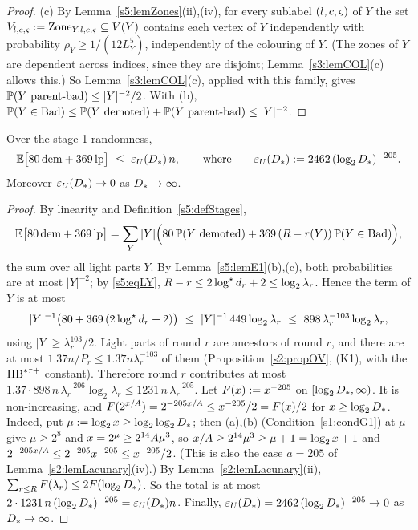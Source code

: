 \begin{proof}
(c) By Lemma~\ref{s5:lemZones}(ii),(iv), for every sublabel $(l,c,\varsigma)$ of $Y$ the set $V_{l,c,\varsigma}\mathrel{:=}\mathrm{Zone}_{Y,l,c,\varsigma}\subseteq V(Y)$ contains each vertex of $Y$ independently with probability $\rho_Y\ge 1/(12L_Y^5)$, independently of the colouring of $Y$. (The zones of $Y$ are dependent across indices, since they are disjoint; Lemma~\ref{s3:lemCOL}(c) allows this.) So Lemma~\ref{s3:lemCOL}(c), applied with this family, gives $\mathbb{P}(Y\text{ parent-bad})\le|Y|^{-2}/2$. With (b), $\mathbb{P}(Y\in\mathrm{Bad})\le\mathbb{P}(Y\text{ demoted})+\mathbb{P}(Y\text{ parent-bad})\le|Y|^{-2}$.
\end{proof}

\begin{lemma}\label{s5:lemExpect}
Over the stage-1 randomness,
\[
\Ex\bigl[\cVX\,\mathrm{dem}+\cPV\,\mathrm{lp}\bigr]\ \le\ \epsU(\Dstar)\,n,\qquad\text{where}\qquad \epsU(\Dstar)\defeq 2462\,(\log_2\Dstar)^{-205}.
\]
Moreover $\varepsilon_{U}(D_{*})\to0$ as $D_{*}\to\infty$.
\deps{\ref{s5:lemE1}, \ref{s5:defStages}, \ref{s2:propOV}, \ref{s2:lemTower}, \ref{s2:lemLacunary}, \ref{s1:condG1}, \ref{s2:propStructure}}
\end{lemma}

\begin{proof}
By linearity and Definition~\ref{s5:defStages},
\[
\mathbb{E}\bigl[80\,\mathrm{dem}+369\,\mathrm{lp}\bigr]=\sum_{Y}|Y|\Bigl(80\,\mathbb{P}(Y\text{ demoted})+369\,(R-r(Y))\,\mathbb{P}(Y\in\mathrm{Bad})\Bigr),
\]
the sum over all light parts $Y$. By Lemma~\ref{s5:lemE1}(b),(c), both probabilities are at most $|Y|^{-2}$; by \eqref{s5:eqLY}, $R-r\le 2\log^{\star} d_r+2\le\log_2\lambda_r$. Hence the term of $Y$ is at most
\[
|Y|^{-1}\bigl(80+369\,(2\logs d_r+2)\bigr)\ \le\ |Y|^{-1}\,449\log_2\lambda_r\ \le\ 898\,\lambda_r^{-103}\log_2\lambda_r ,
\]
using $|Y|\ge\lambda_r^{103}/2$. Light parts of round $r$ are ancestors of round $r$, and there are at most $1.37n/P_r\le 1.37n\lambda_r^{-103}$ of them (Proposition~\ref{s2:propOV}, (K1), with the $\mathrm{HB}^{*\tau{+}}$ constant). Therefore round $r$ contributes at most $1.37\cdot898\,n\,\lambda_r^{-206}\log_2\lambda_r\le 1231\,n\,\lambda_r^{-205}$. Let $F(x)\mathrel{:=} x^{-205}$ on $[\log_2D_{*},\infty)$. It is non-increasing, and $F(2^{x/A})=2^{-205x/A}\le x^{-205}/2=F(x)/2$ for $x\ge\log_2D_{*}$. Indeed, put $\mu\mathrel{:=}\log_2x\ge\log_2\log_2D_{*}$; then (a),(b) (Condition~\ref{s1:condG1}) at $\mu$ give $\mu\ge2^8$ and $x=2^\mu\ge2^{14}A\mu^3$, so $x/A\ge2^{14}\mu^3\ge\mu+1=\log_2x+1$ and $2^{-205x/A}\le2^{-205}x^{-205}\le x^{-205}/2$. (This is also the case $a=205$ of Lemma~\ref{s2:lemLacunary}(iv).) By Lemma~\ref{s2:lemLacunary}(ii), $\sum_{r\le R}F(\lambda_r)\le 2F(\log_2D_{*})$. So the total is at most $2\cdot1231\,n\,(\log_2D_{*})^{-205}=\varepsilon_{U}(D_{*})n$. Finally, $\varepsilon_{U}(D_{*})=2462\,(\log_2D_{*})^{-205}\to0$ as $D_{*}\to\infty$.
\end{proof}

